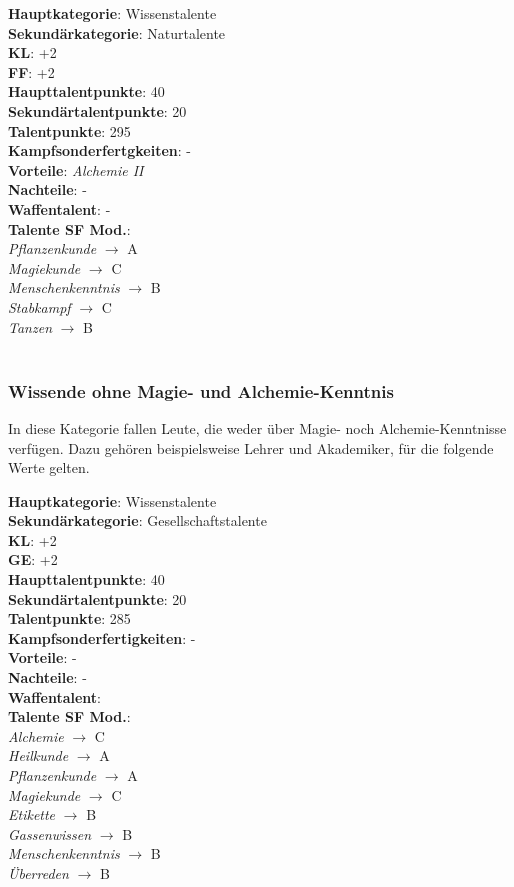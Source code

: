 \textbf{Hauptkategorie}: Wissenstalente \\
\textbf{Sekundärkategorie}: Naturtalente \\
\textbf{KL}: +2 \\
\textbf{FF}: +2 \\
\textbf{Haupttalentpunkte}: 40 \\
\textbf{Sekundärtalentpunkte}: 20 \\
\textbf{Talentpunkte}: 295 \\
\textbf{Kampfsonderfertgkeiten}: - \\
\textbf{Vorteile}: \textit{Alchemie II} \\
\textbf{Nachteile}: - \\
\textbf{Waffentalent}: - \\
\textbf{Talente SF Mod.}: \\
\textit{Pflanzenkunde} $\rightarrow$ A \\
\textit{Magiekunde} $\rightarrow$ C \\ 
\textit{Menschenkenntnis} $\rightarrow$ B \\
\textit{Stabkampf} $\rightarrow$ C \\
\textit{Tanzen} $\rightarrow$ B \\
~\\

\subsubsection{Wissende ohne Magie- und Alchemie-Kenntnis}
In diese Kategorie fallen Leute, die weder über Magie- noch Alchemie-Kenntnisse verfügen. Dazu gehören beispielsweise Lehrer und Akademiker, für die folgende Werte gelten.

\textbf{Hauptkategorie}: Wissenstalente \\
\textbf{Sekundärkategorie}: Gesellschaftstalente \\
\textbf{KL}: +2 \\
\textbf{GE}: +2 \\
\textbf{Haupttalentpunkte}: 40 \\
\textbf{Sekundärtalentpunkte}: 20 \\
\textbf{Talentpunkte}: 285 \\
\textbf{Kampfsonderfertigkeiten}: - \\
\textbf{Vorteile}: - \\
\textbf{Nachteile}: - \\
\textbf{Waffentalent}:\\
\textbf{Talente SF Mod.}: \\
\textit{Alchemie} $\rightarrow$ C \\
\textit{Heilkunde} $\rightarrow$ A \\
\textit{Pflanzenkunde} $\rightarrow$ A \\
\textit{Magiekunde} $\rightarrow$ C \\
\textit{Etikette} $\rightarrow$ B \\
\textit{Gassenwissen} $\rightarrow$ B \\
\textit{Menschenkenntnis} $\rightarrow$ B \\
\textit{Überreden} $\rightarrow$ B \\


